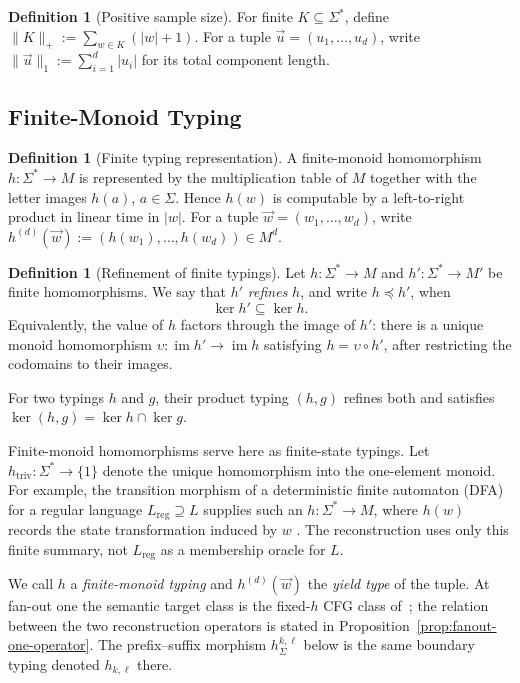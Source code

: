 \documentclass[11pt]{article}
\numberwithin{equation}{section}
\theoremstyle{plain}
\theoremstyle{definition}
\newtheorem{definition}[theorem]{Definition}
\theoremstyle{remark}
\newcommand{\tuple}[1]{\vec{#1}}
\begin{document}
\begin{definition}[Positive sample size]
For finite \(K\subseteq\Sigma^*\), define
\(\|K\|_+:=\sum_{w\in K}(|w|+1)\).
For a tuple \(\tuple u=(u_1,\ldots,u_d)\), write
\(\|\tuple u\|_1:=\sum_{i=1}^d |u_i|\)
for its total component length.
\end{definition}


\subsection{Finite-Monoid Typing}

\begin{definition}[Finite typing representation]
\label{def-monoid-morphism}
A finite-monoid homomorphism \(h\colon\Sigma^*\to M\) is represented by the
multiplication table of \(M\) together with the letter images \(h(a)\),
\(a\in\Sigma\).  Hence \(h(w)\) is computable by a left-to-right product in
linear time in \(|w|\).  For a tuple \(\tuple w=(w_1,\ldots,w_d)\), write
\(h^{(d)}(\tuple w):=(h(w_1),\ldots,h(w_d))\in M^d\).
\end{definition}

\begin{definition}[Refinement of finite typings]
\label{def:h-refinement}
Let \(h\colon\Sigma^*\to M\) and \(h'\colon\Sigma^*\to M'\) be finite
homomorphisms.  We say that \(h'\) \emph{refines} \(h\), and write
\(h\preceq h'\), when
\[
  \ker h'\subseteq\ker h.
\]
Equivalently, the value of \(h\) factors through the image of \(h'\): there is
a unique monoid homomorphism
\(\upsilon\colon\operatorname{im}h'\to\operatorname{im}h\) satisfying
\(h=\upsilon\circ h'\), after restricting the codomains to their images.
\end{definition}

For two typings $h$ and $g$, their product typing $(h,g)$ refines both and
satisfies $\ker(h,g)=\ker h\cap\ker g$.

Finite-monoid homomorphisms serve here as finite-state typings.  Let
$h_{\mathrm{triv}}:\Sigma^*\to\{1\}$ denote the unique homomorphism into the
one-element monoid.
For example, the transition morphism of a deterministic finite automaton (DFA) for a regular language
$L_{\mathrm{reg}}\supseteq L$ supplies such an $h:\Sigma^*\to M$, where $h(w)$ records the
state transformation induced by $w$ \cite{Pin1986}.  The reconstruction uses
only this finite summary, not $L_{\mathrm{reg}}$ as a membership oracle for $L$.


We call $h$ a \emph{finite-monoid typing} and $h^{(d)}(\tuple w)$ the
\emph{yield type} of the tuple.  At fan-out one the semantic target class is
the fixed-$h$ CFG class of~\cite{kuriyamaCFG}; the relation between the two
reconstruction operators is stated in Proposition~\ref{prop:fanout-one-operator}.
The prefix--suffix morphism $h_\Sigma^{k,\ell}$ below is the same boundary
typing denoted $h_{k,\ell}$ there.
\end{document}
